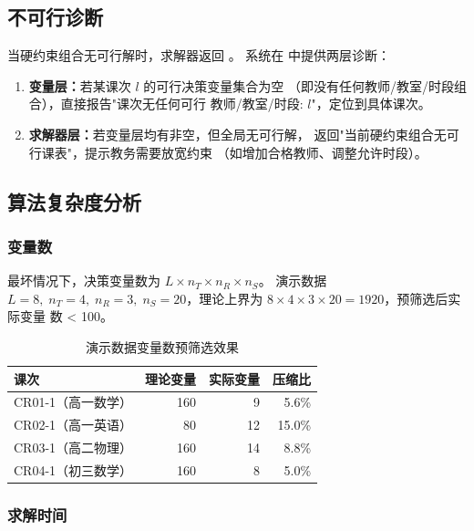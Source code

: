 \subsection{不可行诊断}

当硬约束组合无可行解时，求解器返回 。
系统在  中提供两层诊断：

\begin{enumerate}[leftmargin=2em,itemsep=0.2em]
\item \textbf{变量层：}若某课次 $l$ 的可行决策变量集合为空
  （即没有任何教师/教室/时段组合），直接报告"课次无任何可行
  教师/教室/时段: $l$"，定位到具体课次。
\item \textbf{求解器层：}若变量层均有非空，但全局无可行解，
  返回"当前硬约束组合无可行课表"，提示教务需要放宽约束
  （如增加合格教师、调整允许时段）。
\end{enumerate}

\subsection{算法复杂度分析}

\subsubsection{变量数}

最坏情况下，决策变量数为 $L \times n_T \times n_R \times n_S$。
演示数据 $L=8,\;n_T=4,\;n_R=3,\;n_S=20$，理论上界为
$8 \times 4 \times 3 \times 20 = 1920$，预筛选后实际变量
数 < 100。

\begin{table}[h]
\centering
\caption{演示数据变量数预筛选效果}
\label{tab:var-shrink}
\small
\begin{tabularx}{\textwidth}{l r r r}
\toprule
\textbf{课次} & \textbf{理论变量} & \textbf{实际变量} & \textbf{压缩比} \\
\midrule
CR01-1（高一数学）
  & 160 & 9 & 5.6\% \\
CR02-1（高一英语）
  & 80 & 12 & 15.0\% \\
CR03-1（高二物理）
  & 160 & 14 & 8.8\% \\
CR04-1（初三数学）
  & 160 & 8 & 5.0\% \\
\bottomrule
\end{tabularx}
\end{table}

\subsubsection{求解时间}

